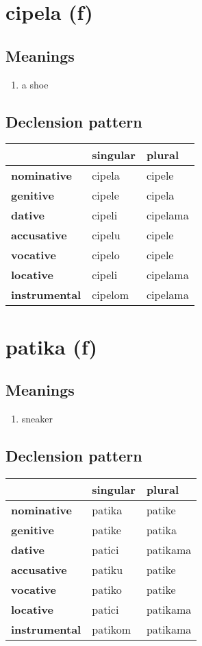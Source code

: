 \filbreak
\section{cipela (f)}
\subsection*{Meanings}
\begin{enumerate}
\item a shoe
\end{enumerate}
\subsection*{Declension pattern}
\begin{tabularx}{\linewidth}{Xll}
\toprule
{} & singular &    plural \\
\midrule
\textbf{nominative  } &   cipela &    cipele \\
\textbf{genitive    } &   cipele &    cipela \\
\textbf{dative      } &   cipeli &  cipelama \\
\textbf{accusative  } &   cipelu &    cipele \\
\textbf{vocative    } &   cipelo &    cipele \\
\textbf{locative    } &   cipeli &  cipelama \\
\textbf{instrumental} &  cipelom &  cipelama \\
\bottomrule
\end{tabularx}

\filbreak
\section{patika (f)}
\subsection*{Meanings}
\begin{enumerate}
\item sneaker
\end{enumerate}
\subsection*{Declension pattern}
\begin{tabularx}{\linewidth}{Xll}
\toprule
{} & singular &    plural \\
\midrule
\textbf{nominative  } &   patika &    patike \\
\textbf{genitive    } &   patike &    patika \\
\textbf{dative      } &   patici &  patikama \\
\textbf{accusative  } &   patiku &    patike \\
\textbf{vocative    } &   patiko &    patike \\
\textbf{locative    } &   patici &  patikama \\
\textbf{instrumental} &  patikom &  patikama \\
\bottomrule
\end{tabularx}

